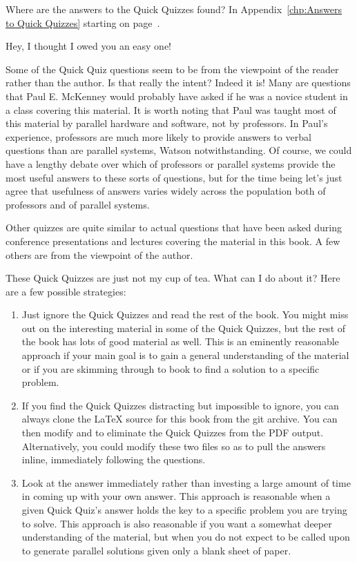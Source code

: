 \QuickQ{}
	Where are the answers to the Quick Quizzes found?
\QuickA{}
	In Appendix~\ref{chp:Answers to Quick Quizzes} starting on
	page~\pageref{chp:Answers to Quick Quizzes}.

	Hey, I thought I owed you an easy one!

\QuickQ{}
	Some of the Quick Quiz questions seem to be from the viewpoint
	of the reader rather than the author.
	Is that really the intent?
\QuickA{}
	Indeed it is!
	Many are questions that Paul E. McKenney would probably have
	asked if he was a novice student in a class covering this material.
	It is worth noting that Paul was taught most of this material by
	parallel hardware and software, not by professors.
	In Paul's experience, professors are much more likely to provide
	answers to verbal questions than are parallel systems,
	Watson notwithstanding.
	Of course, we could have a lengthy debate over which of professors
	or parallel systems provide the most useful answers to these sorts
	of questions,
	but for the time being let's just agree that usefulness of
	answers varies widely across the population both of professors
	and of parallel systems.

	Other quizzes are quite similar to actual questions that have been
	asked during conference presentations and lectures covering the
	material in this book.
	A few others are from the viewpoint of the author.

\QuickQ{}
	These Quick Quizzes are just not my cup of tea.
	What can I do about it?
\QuickA{}
Here are a few possible strategies:

\begin{enumerate}
\item	Just ignore the Quick Quizzes and read the rest of
	the book.
	You might miss out on the interesting material in
	some of the Quick Quizzes, but the rest of the book
	has lots of good material as well.
	This is an eminently reasonable approach if your main
	goal is to gain a general understanding of the material
	or if you are skimming through to book to find a
	solution to a specific problem.
\item	If you find the Quick Quizzes distracting but impossible
	to ignore, you can always clone the \LaTeX{} source for
	this book from the git archive.
	You can then modify  and  to eliminate
	the Quick Quizzes from the PDF output.
	Alternatively, you could modify these two files so as
	to pull the answers inline, immediately following
	the questions.
\item	Look at the answer immediately rather than investing
	a large amount of time in coming up with your own
	answer.
	This approach is reasonable when a given Quick Quiz's
	answer holds the key to a specific problem you are
	trying to solve.
	This approach is also reasonable if you want a somewhat
	deeper understanding of the material, but when you do not
	expect to be called upon to generate parallel solutions given
	only a blank sheet of paper.
\end{enumerate}

